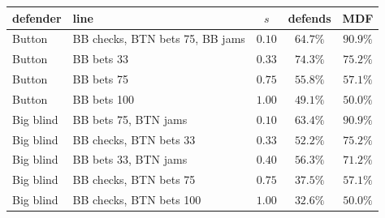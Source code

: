 \begin{tabular}{@{}llccc@{}}
\toprule
defender & line & $s$ & defends & MDF \\ \midrule
Button & BB checks, BTN bets 75, BB jams & $0.10$ & $64.7\%$ & $90.9\%$ \\
Button & BB bets 33 & $0.33$ & $74.3\%$ & $75.2\%$ \\
Button & BB bets 75 & $0.75$ & $55.8\%$ & $57.1\%$ \\
Button & BB bets 100 & $1.00$ & $49.1\%$ & $50.0\%$ \\
Big blind & BB bets 75, BTN jams & $0.10$ & $63.4\%$ & $90.9\%$ \\
Big blind & BB checks, BTN bets 33 & $0.33$ & $52.2\%$ & $75.2\%$ \\
Big blind & BB bets 33, BTN jams & $0.40$ & $56.3\%$ & $71.2\%$ \\
Big blind & BB checks, BTN bets 75 & $0.75$ & $37.5\%$ & $57.1\%$ \\
Big blind & BB checks, BTN bets 100 & $1.00$ & $32.6\%$ & $50.0\%$ \\
\bottomrule
\end{tabular}
